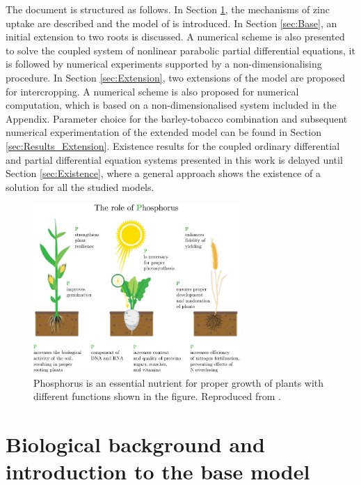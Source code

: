 \documentclass[11pt]{article}
\numberwithin{equation}{section}
\begin{document}
The document is structured as follows. In Section \ref{sec:Bio-background}, the mechanisms of zinc uptake are described and the model of \cite{Ptashnyk-2011} is introduced. 
In Section \ref{sec:Base}, an initial extension to two roots is discussed. A numerical scheme is also presented to solve the coupled system of nonlinear parabolic partial differential equations, it is followed by numerical experiments supported by a non-dimensionalising procedure. In Section \ref{sec:Extension}, two extensions of the model are proposed for intercropping. A numerical scheme is also proposed for numerical computation, which is based on a non-dimensionalised system included in the Appendix.
Parameter choice for the barley-tobacco combination and subsequent numerical experimentation of the extended model can be found in Section \ref{sec:Results_Extension}. Existence results for the coupled ordinary differential and partial differential equation systems presented in this work is delayed until Section \ref{sec:Existence}, where a general approach shows the existence of a solution for all the studied models.

\begin{figure}[!htb]
     \centering
     \includegraphics[width=0.7\textwidth]{Figures/PhosphorusPlantRoles.pdf}
     \caption{Phosphorus is an essential nutrient for proper growth of plants with  different functions shown in the figure. Reproduced from \cite{fertilizers}.}
     \label{fig:Phos}
 \end{figure}
\section{Biological background and introduction to the base model}
\label{sec:Bio-background}
\end{document}
